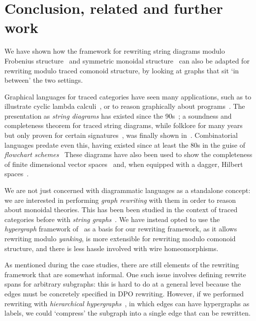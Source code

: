 \section{Conclusion, related and further work}

We have shown how the framework for rewriting string diagrams modulo Frobenius
structure~\cite{bonchi2022string} and symmetric monoidal
structure~\cite{bonchi2021string} can also be adapted for rewriting modulo
traced comonoid structure, by looking at graphs that sit `in between' the two
settings.

Graphical languages for traced categories have seen many applications, such as
to illustrate cyclic lambda calculi~\cite{hasegawa1997recursion}, or to reason
graphically about programs~\cite{schweimeier1999categorical}.
The presentation as \emph{string diagrams} has existed since the
90s~\cite{joyal1991geometry,joyal1996traced}; a soundness and completeness
theorem for traced string diagrams, while folklore for many years but only
proven for certain signatures~\cite{selinger2011survey}, was finally shown
in~\cite{kissinger2014abstract}.
Combinatorial languages predate even this, having existed since at least the 80s
in the guise of
\emph{flowchart schemes}~\cite{stefanescu1990feedback,cazanescu1990new,cazanescu1994feedback}
These diagrams have also been used to show the completeness of finite dimensional
vector spaces~\cite{hasegawa2008finite} and, when equipped with a dagger,
Hilbert spaces~\cite{selinger2012finite}.

We are not just concerned with diagrammatic languages as a standalone concept:
we are interested in performing \emph{graph rewriting} with them in order to
reason about monoidal theories.
This has been been studied in the context of traced categories before with
\emph{string graphs}~\cite{kissinger2012pictures,dixon2013opengraphs}.
We have instead opted to use the \emph{hypergraph} framework
of~\cite{bonchi2022string,bonchi2021string,bonchi2022stringa} as a basis for our
rewriting framework, as it allows rewriting modulo \emph{yanking}, is more
extensible for rewriting modulo comonoid structure, and there is less hassle
involved with wire homeomorphisms.

As mentioned during the case studies, there are still elements of the rewriting
framework that are somewhat informal.
One such issue involves defining rewrite spans for arbitrary subgraphs: this is
hard to do at a general level because the edges must be concretely specified in
DPO rewriting.
However, if we performed rewriting with
\emph{hierarchical hypergraphs}~\cite{alvarez-picallo2021functorial}, in
which edges can have hypergraphs as labels, we could `compress' the subgraph
into a single edge that can be rewritten.

